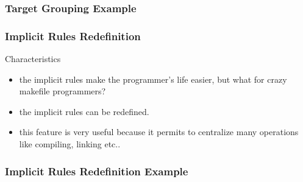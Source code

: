 \documentclass{beamer}
\begin{document}

\begin{frame}
  \frametitle{Target Grouping Example}

  \begin{Example}
    
  \end{Example}

\end{frame}


\begin{frame}
  \frametitle{Implicit Rules Redefinition}

  \begin{block}{Characteristics}
    \begin{itemize}
      \item
        the implicit rules make the programmer's life easier, but what
        for crazy makefile programmers?
      \item
        the implicit rules can be redefined.
      \item
        this feature is very useful because it permits to centralize
        many operations like compiling, linking etc..
    \end{itemize}
  \end{block}

\end{frame}


\begin{frame}
  \frametitle{Implicit Rules Redefinition Example}

  \begin{columns}

    \column{7cm}
      \begin{Example}
        
      \end{Example}

    \column{4cm}
      \begin{Example}
        
      \end{Example}

  \end{columns}

\end{frame}
\end{document}
